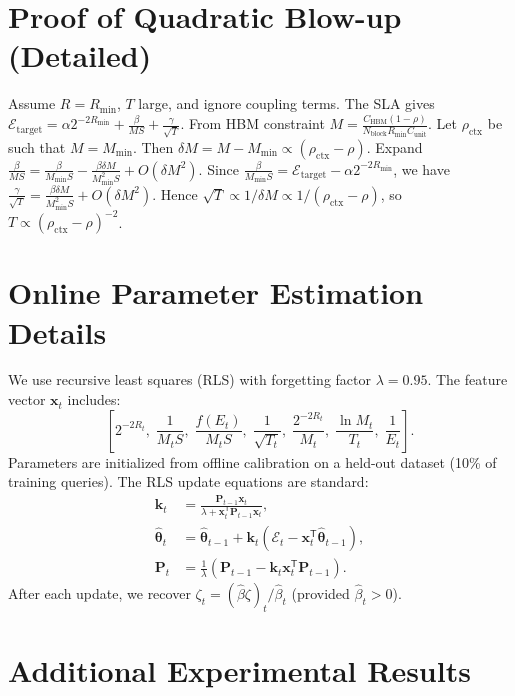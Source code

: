 \documentclass[11pt,a4paper]{article}
\theoremstyle{plain}
\theoremstyle{definition}
\begin{document}
\appendix
\section{Proof of Quadratic Blow-up (Detailed)}
Assume $R=R_{\min}$, $T$ large, and ignore coupling terms. The SLA gives $\mathcal{E}_{\text{target}} = \alpha 2^{-2R_{\min}} + \frac{\beta}{MS} + \frac{\gamma}{\sqrt{T}}$. From HBM constraint $M = \frac{C_{\text{HBM}}(1-\rho)}{N_{\text{block}} R_{\min} C_{\text{unit}}}$. Let $\rho_{\text{ctx}}$ be such that $M=M_{\min}$. Then $\delta M = M-M_{\min} \propto (\rho_{\text{ctx}}-\rho)$. Expand $\frac{\beta}{MS} = \frac{\beta}{M_{\min}S} - \frac{\beta \delta M}{M_{\min}^2 S} + O(\delta M^2)$. Since $\frac{\beta}{M_{\min}S} = \mathcal{E}_{\text{target}} - \alpha 2^{-2R_{\min}}$, we have $\frac{\gamma}{\sqrt{T}} = \frac{\beta \delta M}{M_{\min}^2 S} + O(\delta M^2)$. Hence $\sqrt{T} \propto 1/\delta M \propto 1/(\rho_{\text{ctx}}-\rho)$, so $T \propto (\rho_{\text{ctx}}-\rho)^{-2}$.

\section{Online Parameter Estimation Details}
We use recursive least squares (RLS) with forgetting factor $\lambda=0.95$. The feature vector $\mathbf{x}_t$ includes:
\[
\left[2^{-2R_t},\; \frac{1}{M_t S},\; \frac{f(E_t)}{M_t S},\; \frac{1}{\sqrt{T_t}},\; \frac{2^{-2R_t}}{M_t},\; \frac{\ln M_t}{T_t},\; \frac{1}{E_t}\right].
\]
Parameters are initialized from offline calibration on a held-out dataset (10\% of training queries). The RLS update equations are standard:
\begin{align*}
\mathbf{k}_t &= \frac{\mathbf{P}_{t-1}\mathbf{x}_t}{\lambda + \mathbf{x}_t^{\mathsf{T}}\mathbf{P}_{t-1}\mathbf{x}_t},\\
\hat{\boldsymbol{\theta}}_t &= \hat{\boldsymbol{\theta}}_{t-1} + \mathbf{k}_t(\mathcal{E}_t - \mathbf{x}_t^{\mathsf{T}}\hat{\boldsymbol{\theta}}_{t-1}),\\
\mathbf{P}_t &= \frac{1}{\lambda}\left(\mathbf{P}_{t-1} - \mathbf{k}_t\mathbf{x}_t^{\mathsf{T}}\mathbf{P}_{t-1}\right).
\end{align*}
After each update, we recover $\zeta_t = (\hat{\beta}\zeta)_t / \hat{\beta}_t$ (provided $\hat{\beta}_t>0$).

\section{Additional Experimental Results}
\end{document}
